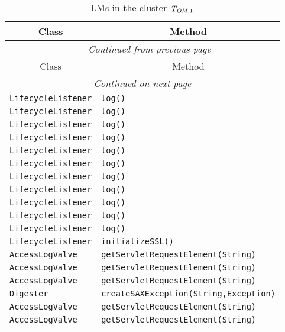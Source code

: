 \begin{center}
\begin{longtable}{ll}
\caption{LMs in the cluster $\mathit{T}_{\mathit{OM},1}$}\\
\toprule\multicolumn{1}{c}{Class}&\multicolumn{1}{c}{Method}\\\midrule
\endfirsthead

\multicolumn{2}{c}{\tablename\ \thetable{}---\textit{Continued from previous page}} \\\midrule
\multicolumn{1}{c}{Class}&\multicolumn{1}{c}{Method}\\\midrule
\endhead
\multicolumn{2}{c}{\textit{Continued on next page}}\\\midrule
\endfoot
\bottomrule
\endlastfoot

\lstinline/LifecycleListener/&{\lstinline/log()/}\\
\lstinline/LifecycleListener/&{\lstinline/log()/}\\
\lstinline/LifecycleListener/&{\lstinline/log()/}\\
\lstinline/LifecycleListener/&{\lstinline/log()/}\\
\lstinline/LifecycleListener/&{\lstinline/log()/}\\
\lstinline/LifecycleListener/&{\lstinline/log()/}\\
\lstinline/LifecycleListener/&{\lstinline/log()/}\\
\lstinline/LifecycleListener/&{\lstinline/log()/}\\
\lstinline/LifecycleListener/&{\lstinline/log()/}\\
\lstinline/LifecycleListener/&{\lstinline/log()/}\\
\lstinline/LifecycleListener/&{\lstinline/log()/}\\
\lstinline/LifecycleListener/&{\lstinline/initializeSSL()/}\\
\lstinline/AccessLogValve/&{\lstinline/getServletRequestElement(String)/}\\
\lstinline/AccessLogValve/&{\lstinline/getServletRequestElement(String)/}\\
\lstinline/AccessLogValve/&{\lstinline/getServletRequestElement(String)/}\\
\lstinline/Digester/&{\lstinline/createSAXException(String,Exception)/}\\
\lstinline/AccessLogValve/&{\lstinline/getServletRequestElement(String)/}\\
\lstinline/AccessLogValve/&{\lstinline/getServletRequestElement(String)/}\\

\end{longtable}
\end{center}
